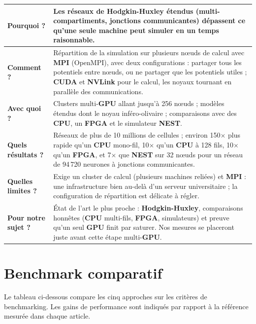 \documentclass{report}
\begin{document}
\medskip
\begin{tabular}{|p{3.2cm}|p{11.2cm}|}
\hline
\textbf{Pourquoi ?} & Les réseaux de \textbf{Hodgkin-Huxley} étendus (multi-compartiments, jonctions communicantes) dépassent ce qu'une seule machine peut simuler en un temps raisonnable. \\ \hline
\textbf{Comment ?} & Répartition de la simulation sur plusieurs nœuds de calcul avec \textbf{MPI} (OpenMPI), avec deux configurations : partager tous les potentiels entre nœuds, ou ne partager que les potentiels utiles ; \textbf{CUDA} et \textbf{NVLink} pour le calcul, les noyaux tournant en parallèle des communications. \\ \hline
\textbf{Avec quoi ?} & Clusters multi-\textbf{GPU} allant jusqu'à 256 nœuds ; modèles étendus dont le noyau inféro-olivaire ; comparaisons avec des \textbf{CPU}, un \textbf{FPGA} et le simulateur \textbf{NEST}. \\ \hline
\textbf{Quels résultats ?} & Réseaux de plus de 10 millions de cellules ; environ 150$\times$ plus rapide qu'un \textbf{CPU} mono-fil, 10$\times$ qu'un \textbf{CPU} à 128 fils, 10$\times$ qu'un \textbf{FPGA}, et 7$\times$ que \textbf{NEST} sur 32 nœuds pour un réseau de 94\,720 neurones à jonctions communicantes. \\ \hline
\textbf{Quelles limites ?} & Exige un cluster de calcul (plusieurs machines reliées) et \textbf{MPI} : une infrastructure bien au-delà d'un serveur universitaire ; la configuration de répartition est délicate à régler. \\ \hline
\textbf{Pour notre sujet ?} & État de l'art le plus proche : \textbf{Hodgkin-Huxley}, comparaisons honnêtes (\textbf{CPU} multi-fils, \textbf{FPGA}, simulateurs) et preuve qu'un seul \textbf{GPU} finit par saturer. Nos mesures se placeront juste avant cette étape multi-\textbf{GPU}. \\ \hline
\end{tabular}

\chapter{Benchmark comparatif}

Le tableau ci-dessous compare les cinq approches sur les critères de benchmarking. Les gains de performance sont indiqués par rapport à la référence mesurée dans chaque article.

\medskip
\end{document}
